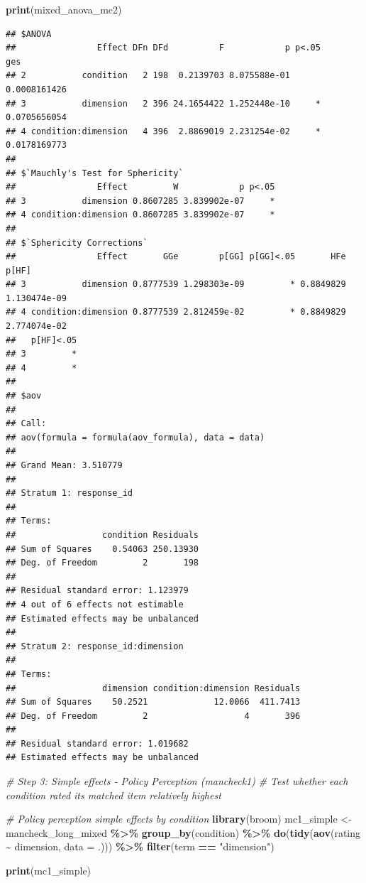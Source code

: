 \documentclass[
]{article}
\newenvironment{Shaded}{\begin{snugshade}}{\end{snugshade}}
\newcommand{\AttributeTok}[1]{\textcolor[rgb]{0.13,0.29,0.53}{#1}}
\newcommand{\CommentTok}[1]{\textcolor[rgb]{0.56,0.35,0.01}{\textit{#1}}}
\newcommand{\FunctionTok}[1]{\textcolor[rgb]{0.13,0.29,0.53}{\textbf{#1}}}
\newcommand{\NormalTok}[1]{#1}
\newcommand{\OtherTok}[1]{\textcolor[rgb]{0.56,0.35,0.01}{#1}}
\newcommand{\SpecialCharTok}[1]{\textcolor[rgb]{0.81,0.36,0.00}{\textbf{#1}}}
\newcommand{\StringTok}[1]{\textcolor[rgb]{0.31,0.60,0.02}{#1}}
\begin{document}
\begin{Shaded}
\begin{Highlighting}[]
\FunctionTok{print}\NormalTok{(mixed\_anova\_mc2)}
\end{Highlighting}
\end{Shaded}

\begin{verbatim}
## $ANOVA
##                Effect DFn DFd          F            p p<.05          ges
## 2           condition   2 198  0.2139703 8.075588e-01       0.0008161426
## 3           dimension   2 396 24.1654422 1.252448e-10     * 0.0705656054
## 4 condition:dimension   4 396  2.8869019 2.231254e-02     * 0.0178169773
## 
## $`Mauchly's Test for Sphericity`
##                Effect         W            p p<.05
## 3           dimension 0.8607285 3.839902e-07     *
## 4 condition:dimension 0.8607285 3.839902e-07     *
## 
## $`Sphericity Corrections`
##                Effect       GGe        p[GG] p[GG]<.05       HFe        p[HF]
## 3           dimension 0.8777539 1.298303e-09         * 0.8849829 1.130474e-09
## 4 condition:dimension 0.8777539 2.812459e-02         * 0.8849829 2.774074e-02
##   p[HF]<.05
## 3         *
## 4         *
## 
## $aov
## 
## Call:
## aov(formula = formula(aov_formula), data = data)
## 
## Grand Mean: 3.510779
## 
## Stratum 1: response_id
## 
## Terms:
##                 condition Residuals
## Sum of Squares    0.54063 250.13930
## Deg. of Freedom         2       198
## 
## Residual standard error: 1.123979
## 4 out of 6 effects not estimable
## Estimated effects may be unbalanced
## 
## Stratum 2: response_id:dimension
## 
## Terms:
##                 dimension condition:dimension Residuals
## Sum of Squares    50.2521             12.0066  411.7413
## Deg. of Freedom         2                   4       396
## 
## Residual standard error: 1.019682
## Estimated effects may be unbalanced
\end{verbatim}

\begin{Shaded}
\begin{Highlighting}[]
\CommentTok{\# Step 3: Simple effects {-} Policy Perception (mancheck1)}
\CommentTok{\# Test whether each condition rated its matched item relatively highest}

\CommentTok{\# Policy perception simple effects by condition}
\FunctionTok{library}\NormalTok{(broom)}
\NormalTok{mc1\_simple }\OtherTok{\textless{}{-}}\NormalTok{ mancheck\_long\_mixed }\SpecialCharTok{\%\textgreater{}\%}
  \FunctionTok{group\_by}\NormalTok{(condition) }\SpecialCharTok{\%\textgreater{}\%}
  \FunctionTok{do}\NormalTok{(}\FunctionTok{tidy}\NormalTok{(}\FunctionTok{aov}\NormalTok{(rating }\SpecialCharTok{\textasciitilde{}}\NormalTok{ dimension, }\AttributeTok{data =}\NormalTok{ .))) }\SpecialCharTok{\%\textgreater{}\%}
  \FunctionTok{filter}\NormalTok{(term }\SpecialCharTok{==} \StringTok{"dimension"}\NormalTok{)}

\FunctionTok{print}\NormalTok{(mc1\_simple)}
\end{Highlighting}
\end{Shaded}
\end{document}
